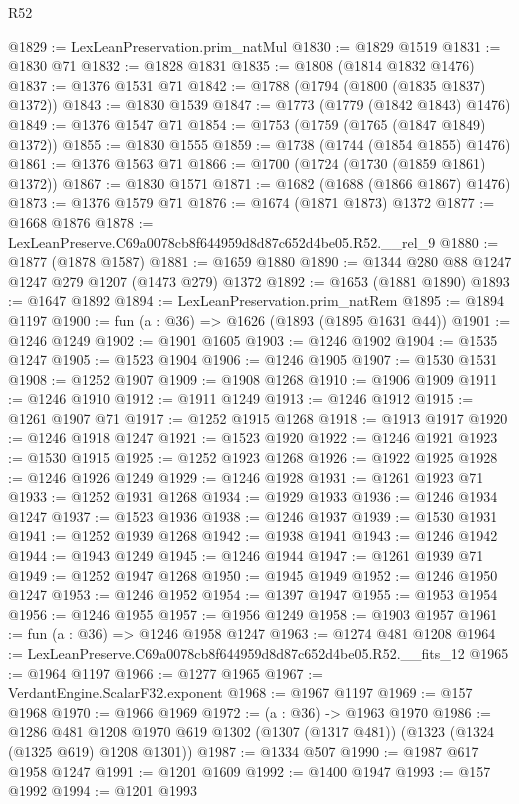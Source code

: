 \begin{lexlean}{R52}
\begin{coremodule}
@1829 := LexLeanPreservation.prim_natMul
@1830 := @1829 @1519
@1831 := @1830 @71
@1832 := @1828 @1831
@1835 := @1808 (@1814 @1832 @1476)
@1837 := @1376 @1531 @71
@1842 := @1788 (@1794 (@1800 (@1835 @1837) @1372))
@1843 := @1830 @1539
@1847 := @1773 (@1779 (@1842 @1843) @1476)
@1849 := @1376 @1547 @71
@1854 := @1753 (@1759 (@1765 (@1847 @1849) @1372))
@1855 := @1830 @1555
@1859 := @1738 (@1744 (@1854 @1855) @1476)
@1861 := @1376 @1563 @71
@1866 := @1700 (@1724 (@1730 (@1859 @1861) @1372))
@1867 := @1830 @1571
@1871 := @1682 (@1688 (@1866 @1867) @1476)
@1873 := @1376 @1579 @71
@1876 := @1674 (@1871 @1873) @1372
@1877 := @1668 @1876
@1878 := LexLeanPreserve.C69a0078cb8f644959d8d87c652d4be05.R52.__rel_9
@1880 := @1877 (@1878 @1587)
@1881 := @1659 @1880
@1890 := @1344 @280 @88 @1247 @1247 @279 @1207 (@1473 @279) @1372
@1892 := @1653 (@1881 @1890)
@1893 := @1647 @1892
@1894 := LexLeanPreservation.prim_natRem
@1895 := @1894 @1197
@1900 := fun (a : @36) => @1626 (@1893 (@1895 @1631 @44))
@1901 := @1246 @1249
@1902 := @1901 @1605
@1903 := @1246 @1902
@1904 := @1535 @1247
@1905 := @1523 @1904
@1906 := @1246 @1905
@1907 := @1530 @1531
@1908 := @1252 @1907
@1909 := @1908 @1268
@1910 := @1906 @1909
@1911 := @1246 @1910
@1912 := @1911 @1249
@1913 := @1246 @1912
@1915 := @1261 @1907 @71
@1917 := @1252 @1915 @1268
@1918 := @1913 @1917
@1920 := @1246 @1918 @1247
@1921 := @1523 @1920
@1922 := @1246 @1921
@1923 := @1530 @1915
@1925 := @1252 @1923 @1268
@1926 := @1922 @1925
@1928 := @1246 @1926 @1249
@1929 := @1246 @1928
@1931 := @1261 @1923 @71
@1933 := @1252 @1931 @1268
@1934 := @1929 @1933
@1936 := @1246 @1934 @1247
@1937 := @1523 @1936
@1938 := @1246 @1937
@1939 := @1530 @1931
@1941 := @1252 @1939 @1268
@1942 := @1938 @1941
@1943 := @1246 @1942
@1944 := @1943 @1249
@1945 := @1246 @1944
@1947 := @1261 @1939 @71
@1949 := @1252 @1947 @1268
@1950 := @1945 @1949
@1952 := @1246 @1950 @1247
@1953 := @1246 @1952
@1954 := @1397 @1947
@1955 := @1953 @1954
@1956 := @1246 @1955
@1957 := @1956 @1249
@1958 := @1903 @1957
@1961 := fun (a : @36) => @1246 @1958 @1247
@1963 := @1274 @481 @1208
@1964 := LexLeanPreserve.C69a0078cb8f644959d8d87c652d4be05.R52.__fits_12
@1965 := @1964 @1197
@1966 := @1277 @1965
@1967 := VerdantEngine.ScalarF32.exponent
@1968 := @1967 @1197
@1969 := @157 @1968
@1970 := @1966 @1969
@1972 := (a : @36) -> @1963 @1970
@1986 := @1286
    @481
    @1208
    @1970
    @619
    @1302
    (@1307 (@1317 @481))
    (@1323 (@1324 (@1325 @619) @1208 @1301))
@1987 := @1334 @507
@1990 := @1987 @617 @1958 @1247
@1991 := @1201 @1609
@1992 := @1400 @1947
@1993 := @157 @1992
@1994 := @1201 @1993

\end{coremodule}
\end{lexlean}
